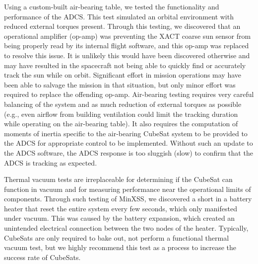 Using a custom-built air-bearing table, we tested the functionality and performance of the ADCS. This test simulated an orbital environment with reduced external torques present. Through this testing, we discovered that an operational amplifier (op-amp) was preventing the XACT coarse sun sensor from being properly read by its internal flight software, and this op-amp was replaced to resolve this issue. It is unlikely this would have been discovered otherwise and may have resulted in the spacecraft not being able to quickly find or accurately track the sun while on orbit. Significant effort in mission operations may have been able to salvage the mission in that situation, but only minor effort was required to replace the offending op-amp. Air-bearing testing requires very careful balancing of the system and as much reduction of external torques as possible (e.g., even airflow from building ventilation could limit the tracking duration while operating on the air-bearing table). It also requires the computation of moments of inertia specific to the air-bearing CubeSat system to be provided to the ADCS for appropriate control to be implemented. Without such an update to the ADCS software, the ADCS response is too sluggish (slow) to confirm that the ADCS is tracking as expected.

Thermal vacuum tests are irreplaceable for determining if the CubeSat can function in vacuum and for measuring performance near the operational limits of components. Through such testing of MinXSS, we discovered a short in a battery heater that reset the entire system every few seconds, which only manifested under vacuum. This was caused by the battery expansion, which created an unintended electrical connection between the two nodes of the heater. Typically, CubeSats are only required to bake out, not perform a functional thermal vacuum test, but we highly recommend this test as a process to increase the success rate of CubeSats.

